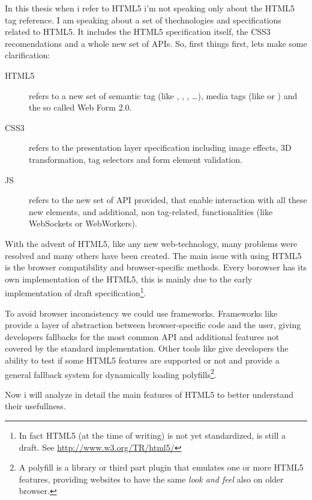In this thesis when i refer to HTML5 i'm not speaking only about the HTML5 tag reference. I am speaking about
a set of thechnologies and specifications related to HTML5. It includes the \ac{HTML5} specification itself,
the \ac{CSS3} recomendations and a whole new set of \js{} APIs. So, first things first, lets make some
clarification:
\begin{description}
	\item[HTML5] refers to a new set of semantic tag (like , , , \ldots),
	media tags (like  or ) and the so called Web Form 2.0.
	\item[CSS3] refers to the presentation layer specification including image effects, 3D transformation,
	tag selectors and form element validation.
	\item[JS] refers to the new set of API provided, that enable interaction with all these new elements, and additional,
	non tag-related, functionalities (like WebSockets or WebWorkers).
\end{description}

With the advent of \ac{HTML5}, like any new web-technology, many problems were resolved and many others
have been created. The main issue with using HTML5 is the browser compatibility and browser-specific methods.
Every borowser has its own implementation of the HTML5, this is mainly due to the early implementation
of draft specification\footnote{In fact HTML5 (at the time of writing) is not yet standardized, is still
a draft. See \url{http://www.w3.org/TR/html5/}}.

To avoid browser inconsistency we could use \js{} frameworks. Frameworks like  provide
a layer of abstraction between browser-specific code and the user, giving developers \js{} fallbacks for the most
common API and additional features not covered by the standard implementation. Other tools like 
give developers the ability to test if some HTML5 features are supported or not and provide a general fallback system
for dynamically loading polyfills\footnote{A polyfill is a \js{} library or third part plugin that emulates one or more HTML5
features, providing websites to have the same \emph{look and feel} also on older browser.}.

Now i will analyze in detail the main features of HTML5 to better understand their usefullness.


